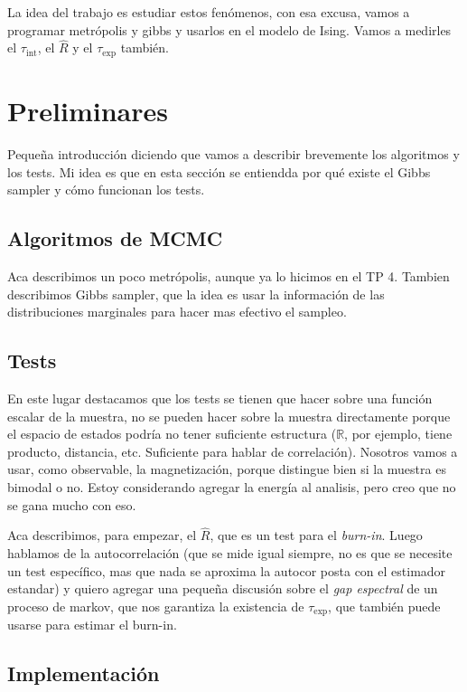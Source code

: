\documentclass[a4paper, 12pt]{article}
\newcommand{\R}{\mathbb{R}}
\newcommand{\tauint}{\tau_\text{int}}
\newcommand{\tauexp}{\tau_\text{exp}}
\begin{document}
La idea del trabajo es estudiar estos fenómenos, con esa excusa, vamos a programar metrópolis y gibbs y usarlos en el modelo de Ising. Vamos a medirles el $\tauint$, el $\hat{R}$ y el $\tauexp$ también.

\section{Preliminares}

Pequeña introducción diciendo que vamos a describir brevemente los algoritmos y los tests. Mi idea es que en esta sección se entiendda por qué existe el Gibbs sampler y cómo funcionan los tests.

\subsection{Algoritmos de MCMC}

Aca describimos un poco metrópolis, aunque ya lo hicimos en el TP 4. Tambien describimos Gibbs sampler, que la idea es usar la información de las distribuciones marginales para hacer mas efectivo el sampleo.

\subsection{Tests}

En este lugar destacamos que los tests se tienen que hacer sobre una función escalar de la muestra, no se pueden hacer sobre la muestra directamente porque el espacio de estados podría no tener suficiente estructura ($\R$, por ejemplo, tiene producto, distancia, etc. Suficiente para hablar de correlación). Nosotros vamos a usar, como observable, la magnetización, porque distingue bien si la muestra es bimodal o no. Estoy considerando agregar la energía al analisis, pero creo que no se gana mucho con eso.

Aca describimos, para empezar, el $\hat{R}$, que es un test para el {\it burn-in}. Luego hablamos de la autocorrelación (que se mide igual siempre, no es que se necesite un test específico, mas que nada se aproxima la autocor posta con el estimador estandar) y quiero agregar una pequeña discusión sobre el {\it gap espectral} de un proceso de markov, que nos garantiza la existencia de $\tauexp$, que también puede usarse para estimar el burn-in.

\subsection{Implementación}
\end{document}
